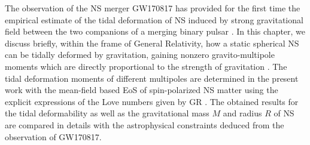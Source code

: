 The observation of the NS merger GW170817 has provided for the first time the empirical
estimate of the tidal deformation of NS induced by strong gravitational field between 
the two companions of a merging binary pulsar \citep{hinderer2008tidal,hinderer2010tidal}. 
In this chapter, 
we discuss briefly, within the frame of General Relativity, how a static spherical NS can be
tidally deformed by gravitation, gaining nonzero gravito-multipole moments which are
directly proportional to the strength of gravitation \citep{damour2009relativistic}.
The tidal deformation moments of different multipoles are determined in the present work 
with the mean-field based EoS of spin-polarized NS matter using the explicit expressions 
of the Love numbers given by GR \citep{perot2021role}. The obtained results for the tidal
deformability as well as the gravitational mass $M$ and radius $R$ of \gls{NS} are 
compared in details with the astrophysical constraints deduced from the observation 
of GW170817.

